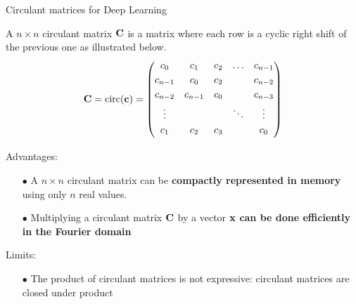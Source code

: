 \begin{frame}{Circulant matrices for Deep Learning}

  A $n \times n$ circulant matrix $\mathbf{C}$ is a matrix  where each row is a cyclic right shift of the previous one as illustrated below.
  \begin{equation*}
      \Cmat = \circulant (\cvec) = 
      \begin{pmatrix} \vspace{0.1cm}
      c_0 & c_1 & c_2 & \dots & c_{n-1} \\ \vspace{0.1cm}
      c_{n-1} & c_0 & c_2  & & c_{n-2} \\ \vspace{0.1cm}
      c_{n-2} & c_{n-1} & c_{0} & & c_{n-3} \\ \vspace{0.1cm}
      \vdots & & & \ddots  & \vdots \\ \vspace{0.1cm}
      c_1 & c_2 & c_3 & & c_0
      \end{pmatrix}
  \end{equation*}
  \begin{block}{Advantages:}
    \begin{itemize}
      \small
      \item[$\bullet$] A $n \times n$ circulant matrix can be \textbf{compactly represented in memory} using only $n$ real values.
      \item[$\bullet$] Multiplying a circulant matrix $\mathbf{C}$ by a vector $\mathbf{x}$ \textbf{can be done efficiently in the Fourier domain}
    \end{itemize}
  \end{block}
  \begin{block}{Limits:}
    \begin{itemize}
      \small
      \item[$\bullet$] The product of circulant matrices is not expressive: circulant matrices are closed under product
    \end{itemize}
  \end{block}

\end{frame}



